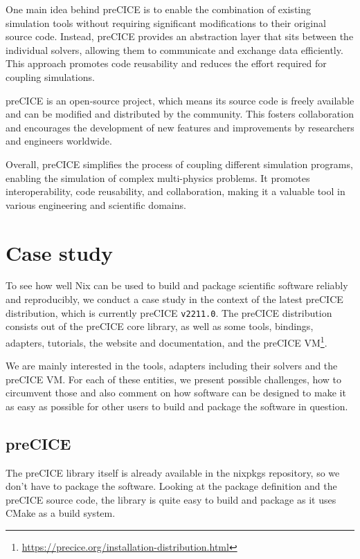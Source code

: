 \documentclass[conference,final,a4paper]{IEEEtran}
\begin{document}
One main idea behind preCICE is to enable the combination of existing simulation tools without requiring significant modifications to their original source code.
Instead, preCICE provides an abstraction layer that sits between the individual solvers, allowing them to communicate and exchange data efficiently.
This approach promotes code reusability and reduces the effort required for coupling simulations.

preCICE is an open-source project, which means its source code is freely available and can be modified and distributed by the community.
This fosters collaboration and encourages the development of new features and improvements by researchers and engineers worldwide.

Overall, preCICE simplifies the process of coupling different simulation programs, enabling the simulation of complex multi-physics problems.
It promotes interoperability, code reusability, and collaboration, making it a valuable tool in various engineering and scientific domains.

\section{Case study}

To see how well Nix can be used to build and package scientific software reliably and reproducibly, we conduct a case study in the context of the latest preCICE distribution, which is currently preCICE \texttt{v2211.0}.
The preCICE distribution consists out of the preCICE core library, as well as some tools, bindings, adapters, tutorials, the website and documentation, and the preCICE VM\footnote{\url{https://precice.org/installation-distribution.html}}.

We are mainly interested in the tools, adapters including their solvers and the preCICE VM.
For each of these entities, we present possible challenges, how to circumvent those and also comment on how software can be designed to make it as easy as possible for other users to build and package the software in question.

\subsection{preCICE}

The preCICE library itself is already available in the nixpkgs repository, so we don't have to package the software.
Looking at the package definition and the preCICE source code, the library is quite easy to build and package as it uses CMake as a build system.
\end{document}

